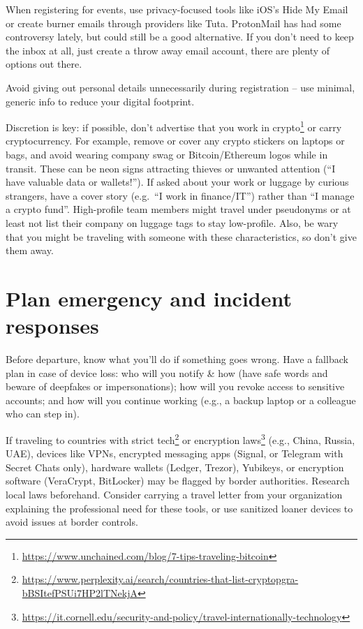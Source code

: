 When registering for events, use privacy-focused tools
like iOS's Hide My Email or create burner emails through
providers like Tuta. ProtonMail has had some controversy
lately, but could still be a good alternative. If you
don't need to keep the inbox at all, just create a throw
away email account, there are plenty of options out there.

Avoid giving out personal details unnecessarily during
registration -- use minimal, generic info to reduce your
digital footprint.

Discretion is key: if possible, don't advertise that you
work in crypto\footnote{\url{https://www.unchained.com/blog/7-tips-traveling-bitcoin}}
or carry cryptocurrency. For example, remove or cover any
crypto stickers on laptops or bags, and avoid wearing
company swag or Bitcoin/Ethereum logos while in transit.
These can be neon signs attracting thieves or unwanted
attention (``I have valuable data or wallets!''). If asked
about your work or luggage by curious strangers, have a
cover story (e.g.\ ``I work in finance/IT'') rather than
``I manage a crypto fund''. High-profile team members
might travel under pseudonyms or at least not list their
company on luggage tags to stay low-profile. Also, be wary
that you might be traveling with someone with these
characteristics, so don't give them away.

\section{Plan emergency and incident responses}

Before departure, know what you'll do if something goes
wrong. Have a fallback plan in case of device loss: who
will you notify \& how (have safe words and beware of
deepfakes or impersonations); how will you revoke access
to sensitive accounts; and how will you continue working
(e.g., a backup laptop or a colleague who can step in).

If traveling to countries with strict
tech\footnote{\url{https://www.perplexity.ai/search/countries-that-list-cryptopgra-bBSItefPSUi7HP2lTNekjA}}
or encryption
laws\footnote{\url{https://it.cornell.edu/security-and-policy/travel-internationally-technology}}
(e.g., China, Russia, UAE), devices like VPNs, encrypted
messaging apps (Signal, or Telegram with Secret Chats
only), hardware wallets (Ledger, Trezor), Yubikeys, or
encryption software (VeraCrypt, BitLocker) may be flagged
by border authorities. Research local laws beforehand.
Consider carrying a travel letter from your organization
explaining the professional need for these tools, or use
sanitized loaner devices to avoid issues at border
controls.

